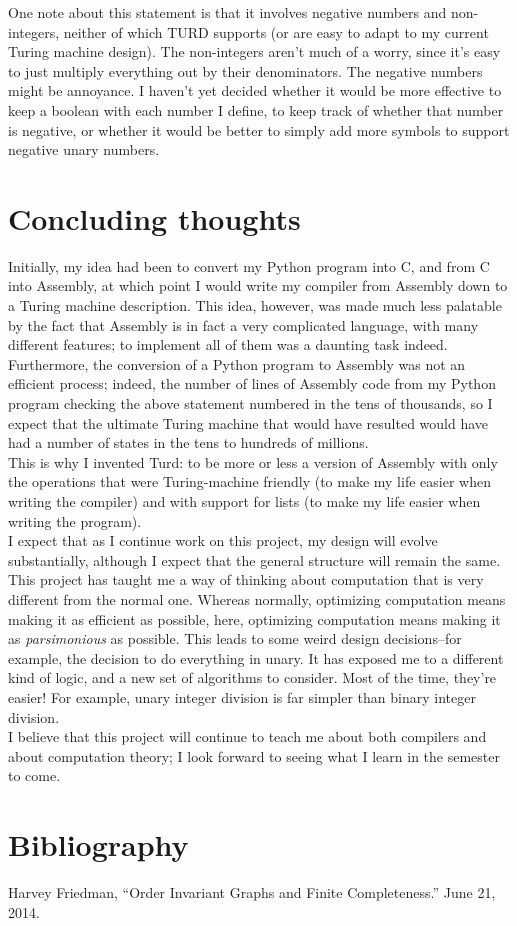 \documentclass{article}
\begin{document}
One note about this statement is that it involves negative numbers and non-integers, neither of which TURD supports (or are easy to adapt to my current Turing machine design). The non-integers aren't much of a worry, since it's easy to just multiply everything out by their denominators. The negative numbers might be annoyance. I haven't yet decided whether it would be more effective to keep a boolean with each number I define, to keep track of whether that number is negative, or whether it would be better to simply add more symbols to support negative unary numbers. \\

\section{Concluding thoughts}

Initially, my idea had been to convert my Python program into C, and from C into Assembly, at which point I would write my compiler from Assembly down to a Turing machine description. This idea, however, was made much less palatable by the fact that Assembly is in fact a very complicated language, with many different features; to implement all of them was a daunting task indeed. Furthermore, the conversion of a Python program to Assembly was not an efficient process; indeed, the number of lines of Assembly code from my Python program checking the above statement numbered in the tens of thousands, so I expect that the ultimate Turing machine that would have resulted would have had a number of states in the tens to hundreds of millions. \\

This is why I invented Turd: to be more or less a version of Assembly with only the operations that were Turing-machine friendly (to make my life easier when writing the compiler) and with support for lists (to make my life easier when writing the program). \\

I expect that as I continue work on this project, my design will evolve substantially, although I expect that the general structure will remain the same. This project has taught me a way of thinking about computation that is very different from the normal one. Whereas normally, optimizing computation means making it as efficient as possible, here, optimizing computation means making it as \emph{parsimonious} as possible. This leads to some weird design decisions--for example, the decision to do everything in unary. It has exposed me to a different kind of logic, and a new set of algorithms to consider. Most of the time, they're easier! For example, unary integer division is far simpler than binary integer division. \\

I believe that this project will continue to teach me about both compilers and about computation theory; I look forward to seeing what I learn in the semester to come.

\section{Bibliography}

Harvey Friedman, “Order Invariant Graphs and Finite Completeness.” June 21, 2014.
\end{document}
